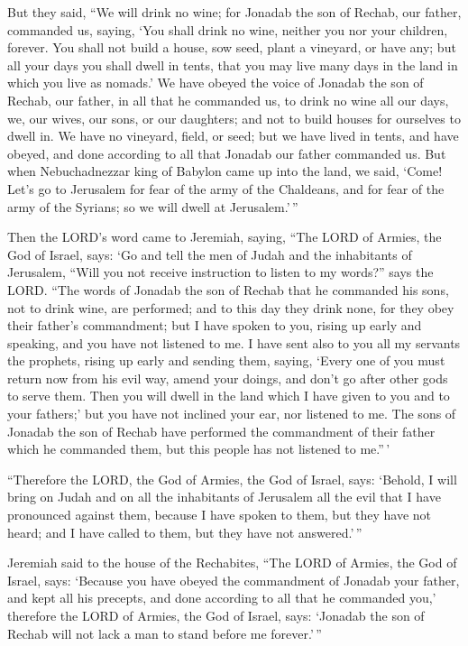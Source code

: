  But they said, ``We will drink no wine; for Jonadab the
son of Rechab, our father, commanded us, saying, `You shall drink no
wine, neither you nor your children, forever.  You shall
not build a house, sow seed, plant a vineyard, or have any; but all your
days you shall dwell in tents, that you may live many days in the land
in which you live as nomads.'  We have obeyed the voice of
Jonadab the son of Rechab, our father, in all that he commanded us, to
drink no wine all our days, we, our wives, our sons, or our daughters;
 and not to build houses for ourselves to dwell in. We
have no vineyard, field, or seed;  but we have lived in
tents, and have obeyed, and done according to all that Jonadab our
father commanded us.  But when Nebuchadnezzar king of
Babylon came up into the land, we said, `Come! Let's go to Jerusalem for
fear of the army of the Chaldeans, and for fear of the army of the
Syrians; so we will dwell at Jerusalem.'\,''

 Then the LORD's word came to Jeremiah, saying,
 ``The LORD of Armies, the God of Israel, says: `Go and
tell the men of Judah and the inhabitants of Jerusalem, ``Will you not
receive instruction to listen to my words?'' says the LORD.
 ``The words of Jonadab the son of Rechab that he
commanded his sons, not to drink wine, are performed; and to this day
they drink none, for they obey their father's commandment; but I have
spoken to you, rising up early and speaking, and you have not listened
to me.  I have sent also to you all my servants the
prophets, rising up early and sending them, saying, `Every one of you
must return now from his evil way, amend your doings, and don't go after
other gods to serve them. Then you will dwell in the land which I have
given to you and to your fathers;' but you have not inclined your ear,
nor listened to me.  The sons of Jonadab the son of
Rechab have performed the commandment of their father which he commanded
them, but this people has not listened to me.''\,'

 ``Therefore the LORD, the God of Armies, the God of
Israel, says: `Behold, I will bring on Judah and on all the inhabitants
of Jerusalem all the evil that I have pronounced against them, because I
have spoken to them, but they have not heard; and I have called to them,
but they have not answered.'\,''

 Jeremiah said to the house of the Rechabites, ``The LORD
of Armies, the God of Israel, says: `Because you have obeyed the
commandment of Jonadab your father, and kept all his precepts, and done
according to all that he commanded you,'  therefore the
LORD of Armies, the God of Israel, says: `Jonadab the son of Rechab will
not lack a man to stand before me forever.'\,''

